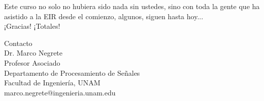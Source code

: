 \documentclass[10pt,spanish,aspectratio=1610]{beamer}
\begin{document}



\begin{frame}
  \large{Este curso no solo no hubiera sido nada sin ustedes, sino con toda la gente que ha asistido a la EIR desde el comienzo, algunos, siguen hasta hoy...}
  \[\]
  \Large{¡Gracias! ¡Totales!}
\end{frame}

\begin{frame}
  \Large{Contacto}
  \[\]
  \large
  Dr. Marco Negrete\\
  Profesor Asociado\\
  Departamento de Procesamiento de Señales\\
  Facultad de Ingeniería, UNAM
  \[\]
  marco.negrete@ingenieria.unam.edu\\
\end{frame}
\end{document}
